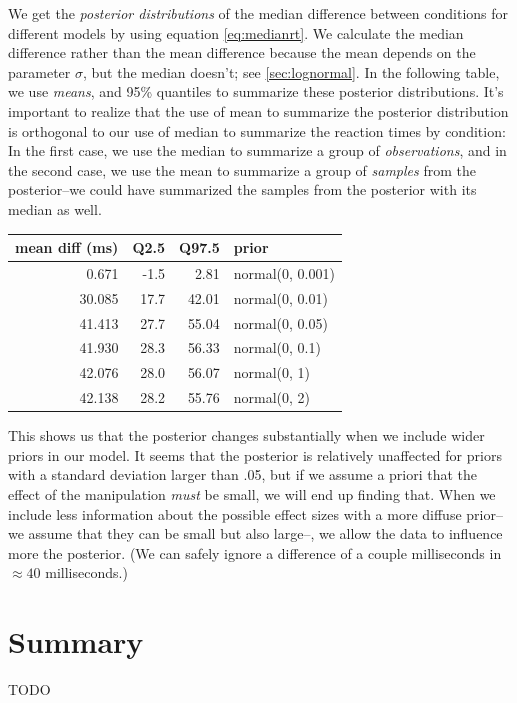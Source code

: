 \documentclass[12pt,]{krantz}
\theoremstyle{definition}
\theoremstyle{definition}
\theoremstyle{definition}
\theoremstyle{remark}
\begin{document}
We get the \emph{posterior distributions} of the median difference
between conditions for different models by using equation
\eqref{eq:medianrt}. We calculate the median difference rather than the
mean difference because the mean depends on the parameter \(\sigma\),
but the median doesn't; see \ref{sec:lognormal}. In the following table,
we use \emph{means}, and 95\% quantiles to summarize these posterior
distributions. It's important to realize that the use of mean to
summarize the posterior distribution is orthogonal to our use of median
to summarize the reaction times by condition: In the first case, we use
the median to summarize a group of \emph{observations}, and in the
second case, we use the mean to summarize a group of \emph{samples} from
the posterior--we could have summarized the samples from the posterior
with its median as well.

\begin{tabular}{r|r|r|l}
\hline
mean diff (ms) & Q2.5 & Q97.5 & prior\\
\hline
0.671 & -1.5 & 2.81 & normal(0, 0.001)\\
\hline
30.085 & 17.7 & 42.01 & normal(0, 0.01)\\
\hline
41.413 & 27.7 & 55.04 & normal(0, 0.05)\\
\hline
41.930 & 28.3 & 56.33 & normal(0, 0.1)\\
\hline
42.076 & 28.0 & 56.07 & normal(0, 1)\\
\hline
42.138 & 28.2 & 55.76 & normal(0, 2)\\
\hline
\end{tabular}

This shows us that the posterior changes substantially when we include
wider priors in our model. It seems that the posterior is relatively
unaffected for priors with a standard deviation larger than .05, but if
we assume a priori that the effect of the manipulation \emph{must} be
small, we will end up finding that. When we include less information
about the possible effect sizes with a more diffuse prior--we assume
that they can be small but also large--, we allow the data to influence
more the posterior. (We can safely ignore a difference of a couple
milliseconds in \(\approx 40\) milliseconds.)

\section{Summary}\label{summary-2}

TODO
\end{document}

